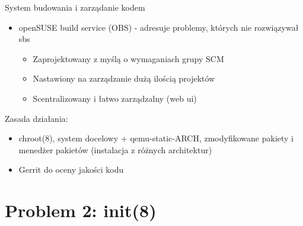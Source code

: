 \documentclass[presentation,aspectratio=43,12pt]{beamer}
\begin{document}
\begin{frame}[label=sec-3-11]{System budowania i zarządanie kodem}
\begin{itemize}
\item openSUSE build service (OBS) - adresuje problemy, których nie
rozwiązywał sbs
\begin{itemize}
\item Zaprojektowany z myślą o wymaganiach grupy SCM
\item Nastawiony na zarządzanie dużą ilością projektów
\item Scentralizowany i łatwo zarządzalny (web ui)
\end{itemize}
\end{itemize}

\pause
Zasada działania:
\begin{itemize}
\item chroot(8), system docelowy + qemu-static-ARCH, zmodyfikowane
pakiety i menedżer pakietów (instalacja z różnych architektur)
\end{itemize}

\pause

\begin{itemize}
\item Gerrit do oceny jakości kodu
\end{itemize}

\end{frame}

\section{Problem 2: init(8)}
\label{sec-4}
\end{document}
